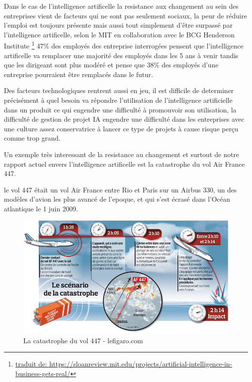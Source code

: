         Dans le cas de l'intelligence artificelle la resistance aux changement au sein des entreprises
        vient de facteurs qui ne sont pas seulement sociaux, la peur de réduire l'emploi 
        est toujours présente mais aussi tout simplement d'être surpassé par l'intelligence
        artificelle, selon le MIT en collaboration avec le BCG Henderson Institute
        \footnote{\url{traduit de: https://sloanreview.mit.edu/projects/artificial-intelligence-in-business-gets-real/}}
        47\% des employés des entreprise interrogées
        pensent que l'intelligence artificelle va remplacer une majorité des employés 
        dans les 5 ans à venir tandis que les dirigeant sont plus modéré et pense 
        que 38\% des employés d'une entreprise pourraient être remplacés dans le futur. 
        \newline

        Des facteurs technologiques rentrent aussi en jeu, il est difficile de determiner 
        précisément à quel besoin va répondre l'utilisation de l'intelligence artificielle 
        dans un produit ce qui engendre une difficulté à promouvoir son utilisation, 
        la difficulté de gestion de projet IA engendre une difficulté dans les entreprises 
        avec une culture assez conservatrice à lancer ce type de projets à cause 
        risque perçu comme trop grand. 
        \newline

        Un exemple très interessant de la resistance au changement et surtout 
        de notre rapport actuel envers l'intelligence artificelle est la catastrophe 
        du vol Air France 447. 
        \newline 
        
        le vol 447 était un vol Air France entre Rio et Paris sur un Airbus 330, un des modèles 
        d'avion les plus avancé de l'epoque, et qui s'est écrasé dans l'Océan atlantique 
        le 1 juin 2009.

        \begin{figure}[H]
            \centering
            \includegraphics[width=1\textwidth]{Images/447}
            \caption{La catastrophe du vol 447 - lefigaro.com}
            \label{fig:447airfrance}
        \end{figure}

